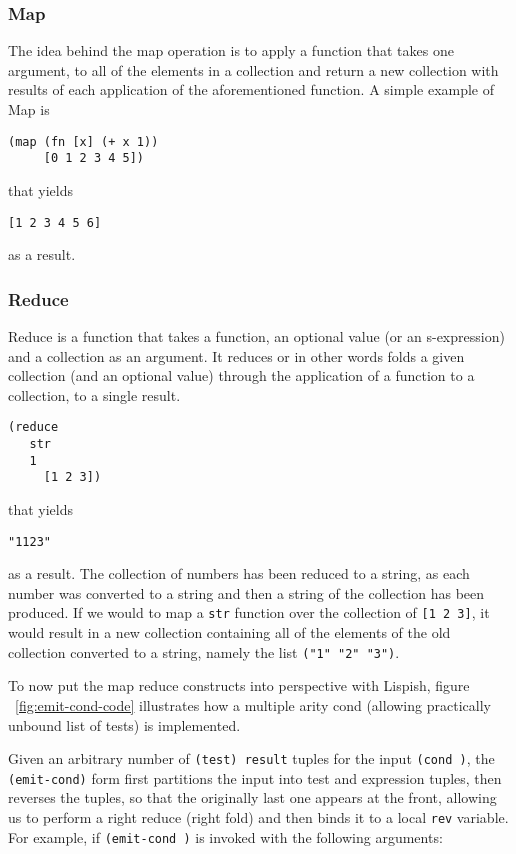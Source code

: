 \subsubsection{Map}
The idea behind the map operation is to apply a function that takes one argument, to all of the elements in a collection and return a new collection with results of each application of the aforementioned function. 
A simple example of Map is 

\begin{verbatim}
(map (fn [x] (+ x 1)) 
	 [0 1 2 3 4 5])
\end{verbatim}
that yields 
\begin{verbatim}
[1 2 3 4 5 6]
\end{verbatim}
as a result.

\subsubsection{Reduce}
Reduce is a function that takes a function, an optional value (or an s-expression) and a collection as an argument. It reduces or in other words folds a given collection (and an optional value) through the application of a function to a collection, to a single result. 
\begin{verbatim}
(reduce 
   str
   1
	 [1 2 3])
\end{verbatim}
that yields 
\begin{verbatim}
"1123"
\end{verbatim}
as a result. The collection of numbers has been reduced to a string, as each number was converted to a string and then a string of the collection has been produced.
If we would to map a \texttt{str} function over the collection of \texttt{[1 2 3]}, it would result in a new collection containing all of the elements of the old collection converted to a string, namely the list \texttt{("1" "2" "3")}.

To now put the map reduce constructs into perspective with Lispish, figure ~\ref{fig:emit-cond-code} illustrates how a multiple arity cond (allowing practically unbound list of tests) is implemented.



Given an arbitrary number of \texttt{(test) result} tuples for the input 
\texttt{(cond )}, the \texttt{(emit-cond)} form first partitions the input into test and expression tuples, then reverses the tuples, so that the originally last one appears at the front, allowing us to perform a right reduce (right fold) and then binds it to a local \texttt{rev} variable. 
For example, if \texttt{(emit-cond )} is invoked with the following arguments:

